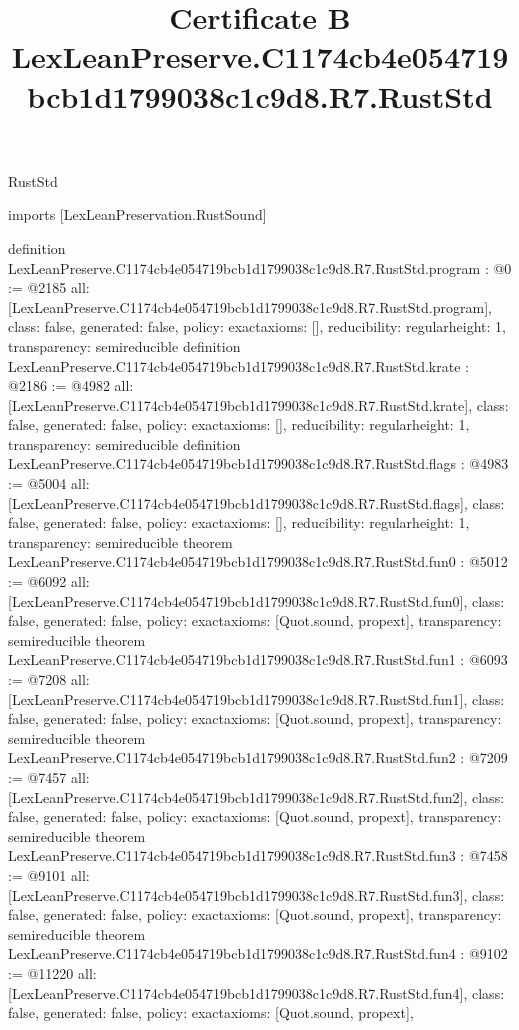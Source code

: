 \begin{lexlean}{RustStd}
\title{Certificate B LexLeanPreserve.C1174cb4e054719bcb1d1799038c1c9d8.R7.RustStd}
\begin{coremodule}
imports [LexLeanPreservation.RustSound]

definition LexLeanPreserve.C1174cb4e054719bcb1d1799038c1c9d8.R7.RustStd.program : @0 := @2185 {
  all: [LexLeanPreserve.C1174cb4e054719bcb1d1799038c1c9d8.R7.RustStd.program],
  class: false,
  generated: false,
  policy: exact{axioms: []},
  reducibility: regular{height: 1},
  transparency: semireducible
}
definition LexLeanPreserve.C1174cb4e054719bcb1d1799038c1c9d8.R7.RustStd.krate : @2186 := @4982 {
  all: [LexLeanPreserve.C1174cb4e054719bcb1d1799038c1c9d8.R7.RustStd.krate],
  class: false,
  generated: false,
  policy: exact{axioms: []},
  reducibility: regular{height: 1},
  transparency: semireducible
}
definition LexLeanPreserve.C1174cb4e054719bcb1d1799038c1c9d8.R7.RustStd.flags : @4983 := @5004 {
  all: [LexLeanPreserve.C1174cb4e054719bcb1d1799038c1c9d8.R7.RustStd.flags],
  class: false,
  generated: false,
  policy: exact{axioms: []},
  reducibility: regular{height: 1},
  transparency: semireducible
}
theorem LexLeanPreserve.C1174cb4e054719bcb1d1799038c1c9d8.R7.RustStd.fun0 : @5012 := @6092 {
  all: [LexLeanPreserve.C1174cb4e054719bcb1d1799038c1c9d8.R7.RustStd.fun0],
  class: false,
  generated: false,
  policy: exact{axioms: [Quot.sound, propext]},
  transparency: semireducible
}
theorem LexLeanPreserve.C1174cb4e054719bcb1d1799038c1c9d8.R7.RustStd.fun1 : @6093 := @7208 {
  all: [LexLeanPreserve.C1174cb4e054719bcb1d1799038c1c9d8.R7.RustStd.fun1],
  class: false,
  generated: false,
  policy: exact{axioms: [Quot.sound, propext]},
  transparency: semireducible
}
theorem LexLeanPreserve.C1174cb4e054719bcb1d1799038c1c9d8.R7.RustStd.fun2 : @7209 := @7457 {
  all: [LexLeanPreserve.C1174cb4e054719bcb1d1799038c1c9d8.R7.RustStd.fun2],
  class: false,
  generated: false,
  policy: exact{axioms: [Quot.sound, propext]},
  transparency: semireducible
}
theorem LexLeanPreserve.C1174cb4e054719bcb1d1799038c1c9d8.R7.RustStd.fun3 : @7458 := @9101 {
  all: [LexLeanPreserve.C1174cb4e054719bcb1d1799038c1c9d8.R7.RustStd.fun3],
  class: false,
  generated: false,
  policy: exact{axioms: [Quot.sound, propext]},
  transparency: semireducible
}
theorem LexLeanPreserve.C1174cb4e054719bcb1d1799038c1c9d8.R7.RustStd.fun4 : @9102 := @11220 {
  all: [LexLeanPreserve.C1174cb4e054719bcb1d1799038c1c9d8.R7.RustStd.fun4],
  class: false,
  generated: false,
  policy: exact{axioms: [Quot.sound, propext]},
}
\end{coremodule}
\end{lexlean}
